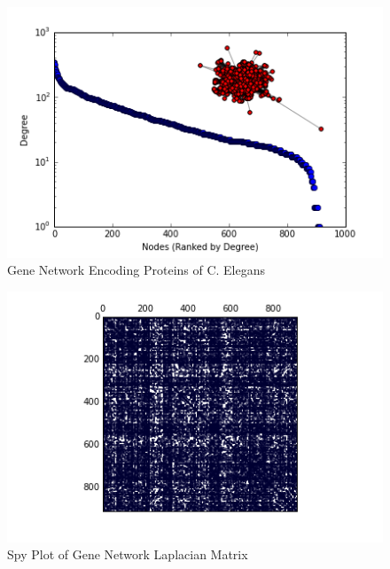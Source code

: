 \documentclass{article}
\begin{document}
\begin{figure}
\centering

\includegraphics[width=\linewidth]{gene_degree_histogram.png}
\caption{Gene Network Encoding Proteins of C. Elegans \cite{Simonis:2009}}
  
\end{figure}

\begin{figure}
\centering
\includegraphics[width = \linewidth]{genespy.png}
\caption{Spy Plot of Gene Network Laplacian Matrix}
\end{figure}
\end{document}
